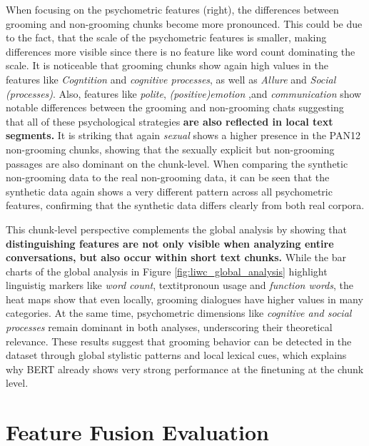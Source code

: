 When focusing on the psychometric features (right), the differences between grooming and non-grooming chunks become more pronounced. This could be due to the fact, that the scale of the psychometric features is smaller, making differences more visible since there is no feature like word count dominating the scale. It is noticeable that grooming chunks show again high values in the features like \textit{Cogntition} and \textit{cognitive processes}, as well as \textit{Allure} and \textit{Social (processes)}. Also, features like \textit{polite}, \textit{(positive)emotion} ,and \textit{communication} show notable differences between the grooming and non-grooming chats suggesting that all of these psychological strategies \textbf{are also reflected in local text segments.} It is striking that again \textit{sexual} shows a higher presence in the PAN12 non-grooming chunks, showing that the sexually explicit but non-grooming passages are also dominant on the chunk-level. When comparing the synthetic non-grooming data to the real non-grooming data, it can be seen that the synthetic data again shows a very different pattern across all psychometric features, confirming that the synthetic data differs clearly from both real corpora. 

This chunk-level perspective complements the global analysis by showing that \textbf{distinguishing features are not only visible when analyzing entire conversations, but also occur within short text chunks.} While the bar charts of the global analysis in Figure \ref{fig:liwc_global_analysis} highlight linguistig markers like \textit{word count}, textit{pronoun usage} and \textit{function words}, the heat maps show that even locally, grooming dialogues have higher values in many categories. At the same time, psychometric dimensions like \textit{cognitive and social processes} remain dominant in both analyses, underscoring their theoretical relevance. These results suggest that grooming behavior can be detected in the dataset through global stylistic patterns and local lexical cues, which explains why BERT already shows very strong performance at the finetuning at the chunk level.

\section{Feature Fusion Evaluation}




